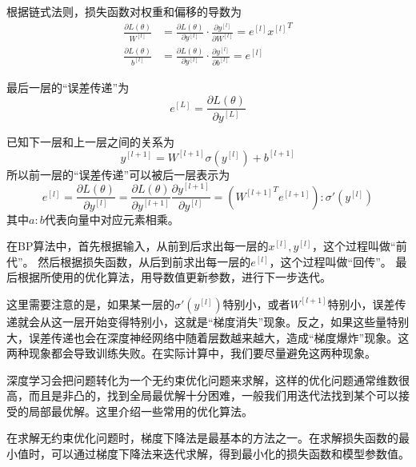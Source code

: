 根据链式法则，损失函数对权重和偏移的导数为
\begin{equation}
\begin{split}
\frac{\partial L(\theta)}{W^{[l]}} & = \frac{\partial L(\theta)}{\partial y^{[l]}} \cdot \frac{\partial y^{[l]}}{\partial W^{[l]}} = e^{[l]} {x^{[l]}}^{T} \\
\frac{\partial L(\theta)}{b^{[l]}} & = \frac{\partial L(\theta)}{\partial y^{[l]}} \cdot \frac{\partial y^{[l]}}{\partial b^{[l]}} = e^{[l]}
\end{split}
\end{equation}

最后一层的“误差传递”为
\begin{equation}
e^{[L]} = \frac{\partial L(\theta)}{\partial y^{[L]}}
\end{equation}

已知下一层和上一层之间的关系为
\begin{equation}
y^{[l+1]} = W^{[l+1]} \sigma(y^{[l]}) + b^{[l+1]}
\end{equation}
所以前一层的“误差传递”可以被后一层表示为
\begin{equation}
e^{[l]} = \frac{\partial L(\theta)}{\partial y^{[l]}} = \frac{\partial L(\theta)}{\partial y^{[l+1]}} \frac{\partial y^{[l+1]}}{\partial y^{[l]}} = ({W^{[l+1]}}^T e^{[l+1]}) : \sigma'(y^{[l]})
\end{equation}
其中$a : b$代表向量中对应元素相乘。

在BP算法中，首先根据输入，从前到后求出每一层的$x^{[l]}, y^{[l]}$，这个过程叫做“前代”。
然后根据损失函数，从后到前求出每一层的$e^{[l]}$，这个过程叫做“回传”。
最后根据所使用的优化算法，用导数值更新参数，进行下一步迭代。

这里需要注意的是，如果某一层的$\sigma'(y^{[l]})$特别小，或者$W^{[l+1]}$特别小，误差传递就会从这一层开始变得特别小，这就是“梯度消失”现象。反之，如果这些量特别大，误差传递也会在深度神经网络中随着层数越来越大，造成“梯度爆炸”现象。这两种现象都会导致训练失败。在实际计算中，我们要尽量避免这两种现象。


深度学习会把问题转化为一个无约束优化问题来求解，这样的优化问题通常维数很高，而且是非凸的，找到全局最优解十分困难，一般我们用迭代法找到某个可以接受的局部最优解。这里介绍一些常用的优化算法。


在求解无约束优化问题时，梯度下降法是最基本的方法之一。在求解损失函数的最小值时，可以通过梯度下降法来迭代求解，得到最小化的损失函数和模型参数值。

